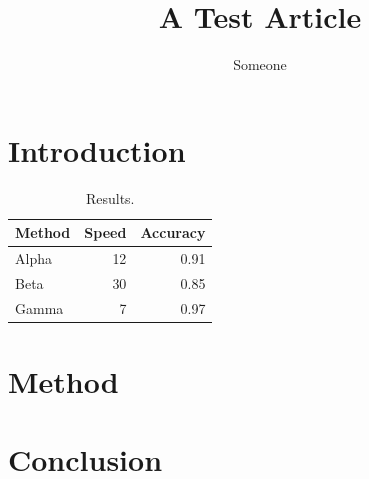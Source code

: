 \documentclass[twocolumn]{article}
\begin{document}
\title{A Test Article}\author{Someone}\maketitle
\section{Introduction}
\lipsum[1-3]
\begin{table}[h]\centering
\begin{tabular}{lrr}\toprule Method & Speed & Accuracy\\\midrule Alpha & 12 & 0.91\\ Beta & 30 & 0.85\\ Gamma & 7 & 0.97\\\bottomrule\end{tabular}
\caption{Results.}\end{table}
\section{Method}
\lipsum[4-7]
\section{Conclusion}
\lipsum[8-9]
\end{document}
